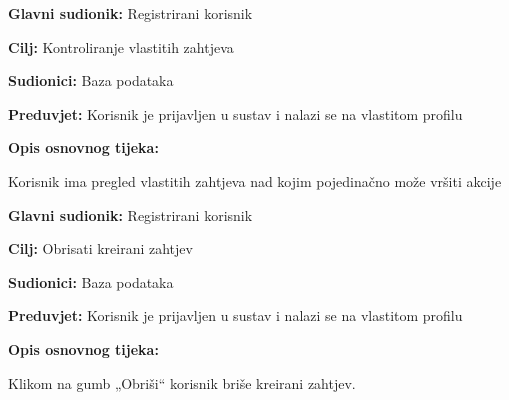 \noindent {}
\begin{packed_item}
	\item \textbf{Glavni sudionik: }Registrirani korisnik
	\item  \textbf{Cilj:} Kontroliranje vlastitih zahtjeva
	\item  \textbf{Sudionici:} Baza podataka
	\item  \textbf{Preduvjet:} Korisnik je prijavljen u sustav i nalazi se na vlastitom profilu
	\item  \textbf{Opis osnovnog tijeka:}
	\item[] \begin{packed_enum}
		\item 	Korisnik ima pregled  vlastitih zahtjeva nad kojim pojedinačno može vršiti akcije 
	\end{packed_enum}
\end{packed_item}

\noindent {}
\begin{packed_item}
	\item \textbf{Glavni sudionik: }Registrirani korisnik
	\item  \textbf{Cilj:} Obrisati kreirani zahtjev
	\item  \textbf{Sudionici:} Baza podataka
	\item  \textbf{Preduvjet:} Korisnik je prijavljen u sustav i nalazi se na vlastitom profilu
	\item  \textbf{Opis osnovnog tijeka:}
	\item[] \begin{packed_enum}
		\item 	Klikom na gumb „Obriši“ korisnik briše kreirani zahtjev. 
	\end{packed_enum}
\end{packed_item}

